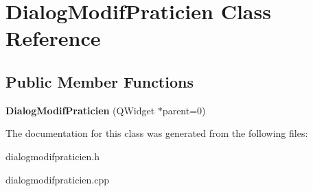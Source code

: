 \hypertarget{classDialogModifPraticien}{\section{Dialog\-Modif\-Praticien Class Reference}
\label{classDialogModifPraticien}
}
\subsection*{Public Member Functions}
\begin{DoxyCompactItemize}
\item 
\hypertarget{classDialogModifPraticien_ad7dd372c86f700ecf2c39b9d3804a2d3}{{\bfseries Dialog\-Modif\-Praticien} (Q\-Widget $\ast$parent=0)}\label{classDialogModifPraticien_ad7dd372c86f700ecf2c39b9d3804a2d3}

\end{DoxyCompactItemize}


The documentation for this class was generated from the following files\-:\begin{DoxyCompactItemize}
\item 
dialogmodifpraticien.\-h\item 
dialogmodifpraticien.\-cpp\end{DoxyCompactItemize}
